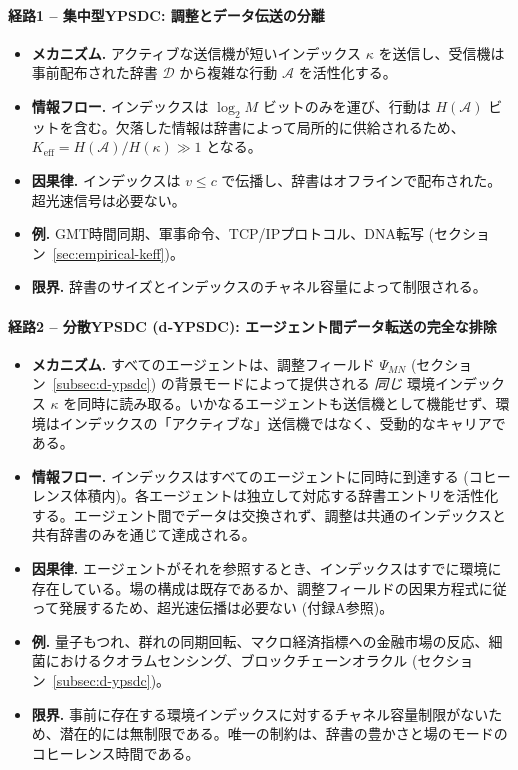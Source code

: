\documentclass[11pt,a4paper]{article}
\begin{document}
	\paragraph*{経路1 – 集中型YPSDC: 調整とデータ伝送の分離}
	\begin{itemize}[leftmargin=*]
		\item \textbf{メカニズム.} アクティブな送信機が短いインデックス $\kappa$ を送信し、受信機は事前配布された辞書 $\mathcal{D}$ から複雑な行動 $\mathcal{A}$ を活性化する。
		\item \textbf{情報フロー.} インデックスは $\log_2 M$ ビットのみを運び、行動は $H(\mathcal{A})$ ビットを含む。欠落した情報は辞書によって局所的に供給されるため、$K_{\mathrm{eff}} = H(\mathcal{A}) / H(\kappa) \gg 1$ となる。
		\item \textbf{因果律.} インデックスは $v \le c$ で伝播し、辞書はオフラインで配布された。超光速信号は必要ない。
		\item \textbf{例.} GMT時間同期、軍事命令、TCP/IPプロトコル、DNA転写 (セクション~\ref{sec:empirical-keff})。
		\item \textbf{限界.} 辞書のサイズとインデックスのチャネル容量によって制限される。
	\end{itemize}
	
	\paragraph*{経路2 – 分散YPSDC (d‑YPSDC): エージェント間データ転送の完全な排除}
	\begin{itemize}[leftmargin=*]
		\item \textbf{メカニズム.} すべてのエージェントは、調整フィールド $\Psi_{MN}$ (セクション~\ref{subsec:d-ypsdc}) の背景モードによって提供される \emph{同じ} 環境インデックス $\kappa$ を同時に読み取る。いかなるエージェントも送信機として機能せず、環境はインデックスの「アクティブな」送信機ではなく、受動的なキャリアである。
		\item \textbf{情報フロー.} インデックスはすべてのエージェントに同時に到達する (コヒーレンス体積内)。各エージェントは独立して対応する辞書エントリを活性化する。エージェント間でデータは交換されず、調整は共通のインデックスと共有辞書のみを通じて達成される。
		\item \textbf{因果律.} エージェントがそれを参照するとき、インデックスはすでに環境に存在している。場の構成は既存であるか、調整フィールドの因果方程式に従って発展するため、超光速伝播は必要ない (付録A参照)。
		\item \textbf{例.} 量子もつれ、群れの同期回転、マクロ経済指標への金融市場の反応、細菌におけるクオラムセンシング、ブロックチェーンオラクル (セクション~\ref{subsec:d-ypsdc})。
		\item \textbf{限界.} 事前に存在する環境インデックスに対するチャネル容量制限がないため、潜在的には無制限である。唯一の制約は、辞書の豊かさと場のモードのコヒーレンス時間である。
	\end{itemize}
	
\end{document}
